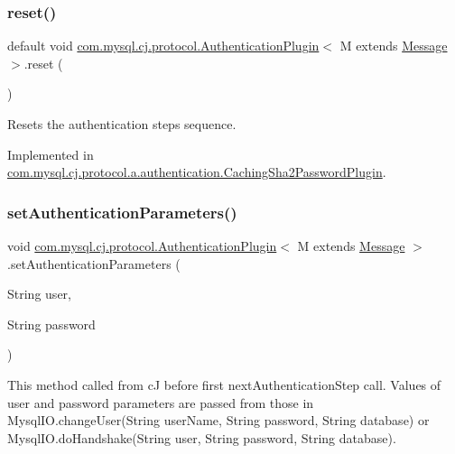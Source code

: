 \subsubsection{\texorpdfstring{reset()}{reset()}}
{\footnotesize\ttfamily default void \mbox{\hyperlink{interfacecom_1_1mysql_1_1cj_1_1protocol_1_1_authentication_plugin}{com.\+mysql.\+cj.\+protocol.\+Authentication\+Plugin}}$<$ M extends \mbox{\hyperlink{interfacecom_1_1mysql_1_1cj_1_1protocol_1_1_message}{Message}} $>$.reset (\begin{DoxyParamCaption}{ }\end{DoxyParamCaption})}

Resets the authentication steps sequence. 

Implemented in \mbox{\hyperlink{classcom_1_1mysql_1_1cj_1_1protocol_1_1a_1_1authentication_1_1_caching_sha2_password_plugin_a7f042851c3087a8bdf431023ed01b29c}{com.\+mysql.\+cj.\+protocol.\+a.\+authentication.\+Caching\+Sha2\+Password\+Plugin}}.

\mbox{\label{interfacecom_1_1mysql_1_1cj_1_1protocol_1_1_authentication_plugin_a22458c3992dbf9f91560d75a99e234d3}} 
\subsubsection{\texorpdfstring{set\+Authentication\+Parameters()}{setAuthenticationParameters()}}
{\footnotesize\ttfamily void \mbox{\hyperlink{interfacecom_1_1mysql_1_1cj_1_1protocol_1_1_authentication_plugin}{com.\+mysql.\+cj.\+protocol.\+Authentication\+Plugin}}$<$ M extends \mbox{\hyperlink{interfacecom_1_1mysql_1_1cj_1_1protocol_1_1_message}{Message}} $>$.set\+Authentication\+Parameters (\begin{DoxyParamCaption}\item[{String}]{user,  }\item[{String}]{password }\end{DoxyParamCaption})}

This method called from cJ before first next\+Authentication\+Step call. Values of user and password parameters are passed from those in Mysql\+I\+O.\+change\+User(String user\+Name, String password, String database) or Mysql\+I\+O.\+do\+Handshake(String user, String password, String database).

